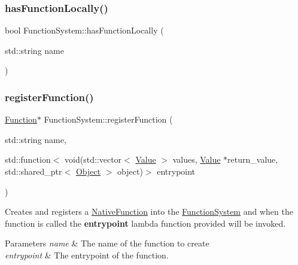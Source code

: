 \mbox{\label{classFunctionSystem_a5bb3f64848489ff7cc4c982c08a10eaa}} 
\subsubsection{\texorpdfstring{has\+Function\+Locally()}{hasFunctionLocally()}}
{\footnotesize\ttfamily bool Function\+System\+::has\+Function\+Locally (\begin{DoxyParamCaption}\item[{std\+::string}]{name }\end{DoxyParamCaption})}

\mbox{\label{classFunctionSystem_a975b09fef826151dd66dece595aa452b}} 
\subsubsection{\texorpdfstring{register\+Function()}{registerFunction()}\hspace{0.1cm}{\footnotesize\ttfamily [1/2]}}
{\footnotesize\ttfamily \hyperlink{classFunction}{Function}$\ast$ Function\+System\+::register\+Function (\begin{DoxyParamCaption}\item[{std\+::string}]{name,  }\item[{std\+::function$<$ void(std\+::vector$<$ \hyperlink{classValue}{Value} $>$ values, \hyperlink{classValue}{Value} $\ast$return\+\_\+value, std\+::shared\+\_\+ptr$<$ \hyperlink{classObject}{Object} $>$ object)$>$}]{entrypoint }\end{DoxyParamCaption})}

Creates and registers a \hyperlink{classNativeFunction}{Native\+Function} into the \hyperlink{classFunctionSystem}{Function\+System} and when the function is called the {\bfseries entrypoint} lambda function provided will be invoked. 
\begin{DoxyParams}{Parameters}
{\em name} & The name of the function to create \\
\hline
{\em entrypoint} & The entrypoint of the function. \\
\hline
\end{DoxyParams}
\mbox{\label{classFunctionSystem_a1a3d54c912c91ea7656cc5a6185a9a6f}} 
